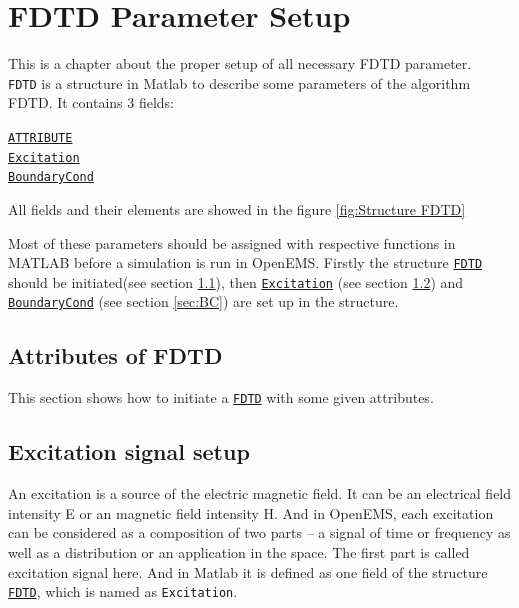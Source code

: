 \chapter{FDTD Parameter Setup}\label{chap:FDTD Parameter Setup}
This is a chapter about the proper setup of all necessary FDTD parameter.\\

\texttt{FDTD}    is a structure in Matlab to describe some parameters of the algorithm FDTD. It contains 3 fields:  \label{para:FDTD} %
       \begin{myindentpar}
	      \hyperref[para:FDTD_ATTRIBUTE]{\texttt{ATTRIBUTE}} \\ 
	      \hyperref[para:Excitation]{\texttt{Excitation}}  \\ 
	      \hyperref[para:BoundaryCond]{\texttt{BoundaryCond}}
       \end{myindentpar}
All fields and  their elements  are showed in the figure \ref{fig:Structure FDTD}


  \def\svgwidth{0.8\textwidth}

Most of these parameters should be assigned with respective functions in MATLAB before a simulation is run in OpenEMS.  Firstly the structure \hyperref[para:FDTD]{\texttt{FDTD}} should be initiated(see section \ref{sec:FDTD_ATTRIBUTE}), then  \hyperref[para:Excitation]{\texttt{Excitation}} (see section \ref{sec:FDTD_Excitation}) and \hyperref[para:BoundaryCond]{\texttt{BoundaryCond}} (see section \ref{sec:BC}) are set up in the structure. %

\section{Attributes of FDTD} \label{sec:FDTD_ATTRIBUTE}
 \label{para:FDTD_ATTRIBUTE}
This section shows how to initiate a \hyperref[para:FDTD]{\texttt{FDTD}} with some given attributes. 

\section{Excitation signal setup} \label{sec:FDTD_Excitation}
An excitation  is a source of the  electric magnetic field. It can be  an electrical field intensity E or an magnetic field intensity H. And  in OpenEMS, each excitation can be considered as a composition  of two parts -- a signal of  time or  frequency as well as  a distribution or an application in the space. The first part is called excitation signal here. And in Matlab it is defined as one field of the structure \hyperref[para:FDTD]{\texttt{FDTD}}, which is named as \texttt{Excitation}.  \label{para:Excitation} \\%

